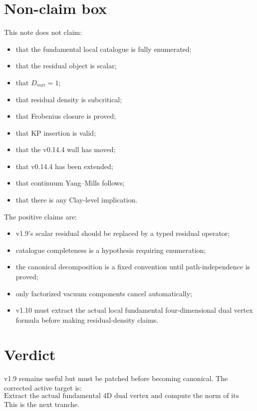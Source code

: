 \documentclass[11pt]{article}
\begin{document}
\section{Non-claim box}

This note does not claim:
\begin{itemize}
  \item that the fundamental local catalogue is fully enumerated;
  \item that the residual object is scalar;
  \item that $D_{\mathrm{vert}}=1$;
  \item that residual density is subcritical;
  \item that Frobenius closure is proved;
  \item that KP insertion is valid;
  \item that the v0.14.4 wall has moved;
  \item that v0.14.4 has been extended;
  \item that continuum Yang--Mills follows;
  \item that there is any Clay-level implication.
\end{itemize}

The positive claims are:
\begin{itemize}
  \item v1.9's scalar residual should be replaced by a typed residual operator;
  \item catalogue completeness is a hypothesis requiring enumeration;
  \item the canonical decomposition is a fixed convention until path-independence is proved;
  \item only factorized vacuum components cancel automatically;
  \item v1.10 must extract the actual local fundamental four-dimensional dual vertex formula before making residual-density claims.
\end{itemize}

\section{Verdict}

v1.9 remains useful but must be patched before becoming canonical. The corrected active target is:
\[
  \boxed{\text{Extract the actual fundamental 4D dual vertex and compute the norm of its residual operator after canonical normal-form reduction.}}
\]
This is the next tranche.
\end{document}
